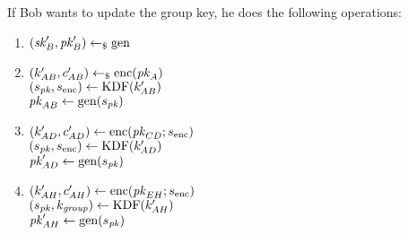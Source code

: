 If Bob wants to update the group key, he does the following operations:
\begin{enumerate}
    \item $(\mathit{sk}'_B, \mathit{pk}'_B)\gets_\$\mathrm{gen}$
    \item $(k'_{AB}, c'_{AB})\gets_\$\mathrm{enc}(\mathit{pk}_A)$\\
        $(s_{\mathit{pk}}, s_{\mathrm{enc}})\gets\mathrm{KDF}(k'_{AB})$\\
        $\mathit{pk}_{AB}\gets\mathrm{gen}(s_{\mathit{pk}})$
    \item $(k'_{AD}, c'_{AD})\gets\mathrm{enc}(\mathit{pk}_{CD}; s_{\mathrm{enc}})$\\
        $(s_{\mathit{pk}}, s_{\mathrm{enc}})\gets\mathrm{KDF}(k'_{AD})$\\
        $\mathit{pk}'_{AD}\gets\mathrm{gen}(s_{\mathit{pk}})$
    \item $(k'_{AH}, c'_{AH})\gets\mathrm{enc}(\mathit{pk}_{EH}; s_{\mathrm{enc}})$\\
        $(s_{\mathit{pk}}, k_{\mathit{group}})\gets\mathrm{KDF}(k'_{AH})$\\
        $\mathit{pk}'_{AH}\gets\mathrm{gen}(s_{\mathit{pk}})$
\end{enumerate}

